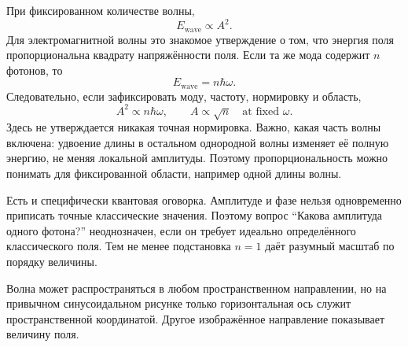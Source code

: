 При фиксированном количестве волны,
\begin{equation}
E_{\text{wave}}\propto A^2.
\end{equation}
Для электромагнитной волны это знакомое утверждение о том, что энергия поля пропорциональна квадрату напряжённости поля. Если та же мода содержит \(n\) фотонов, то
\begin{equation}
E_{\text{wave}}=n\hbar\omega.
\end{equation}
Следовательно, если зафиксировать моду, частоту, нормировку и область,
\begin{equation}
A^2\propto n\hbar\omega,
\qquad
A\propto\sqrt n\quad\text{at fixed }\omega.
\end{equation}
Здесь не утверждается никакая точная нормировка. Важно, какая часть волны включена: удвоение длины в остальном однородной волны изменяет её полную энергию, не меняя локальной амплитуды. Поэтому пропорциональность можно понимать для фиксированной области, например одной длины волны.

Есть и специфически квантовая оговорка. Амплитуде и фазе нельзя одновременно приписать точные классические значения. Поэтому вопрос ``Какова амплитуда одного фотона?'' неоднозначен, если он требует идеально определённого классического поля. Тем не менее подстановка \(n=1\) даёт разумный масштаб по порядку величины.

\begin{classroomqa}
\end{classroomqa}

Волна может распространяться в любом пространственном направлении, но на привычном синусоидальном рисунке только горизонтальная ось служит пространственной координатой. Другое изображённое направление показывает величину поля.

\begin{classroomqa}
\end{classroomqa}

